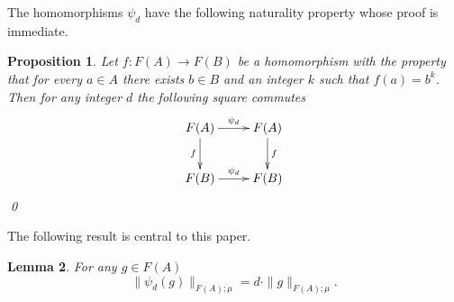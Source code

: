 \documentclass[12pt]{amsart}
\newtheorem{prop}{Proposition}[section]
\newtheorem{lemma}[prop]{Lemma}
\theoremstyle{definition}
\def\Free{F}
\begin{document}
The homomorphisms $\psi_d$ have the following naturality property whose proof is immediate.

\begin{prop}
Let $f \colon \Free(A) \to \Free(B)$ be a homomorphism with the property that for every $a \in A$ there exists $b \in B$ and an integer $k$ such that $f(a)=b^k$.
Then for any integer $d$ the following square commutes
\[
\xymatrix{
\Free(A) \ar[r]^{\psi_d} \ar[d]_{f} &
\Free(A) \ar[d]^{f}
\\
\Free(B) \ar[r]^{\psi_d} &
\Free(B) 
}
\]
\qed
\end{prop}



The following result is central to this paper.



\begin{lemma}\label{L:psid fundamental property}
For any $g \in \Free(A)$
\[
\|\psi_d(g)\|_{F(A);\mu} = d \cdot \| g\|_{F(A);\mu}.
\]
\end{lemma}
\end{document}
